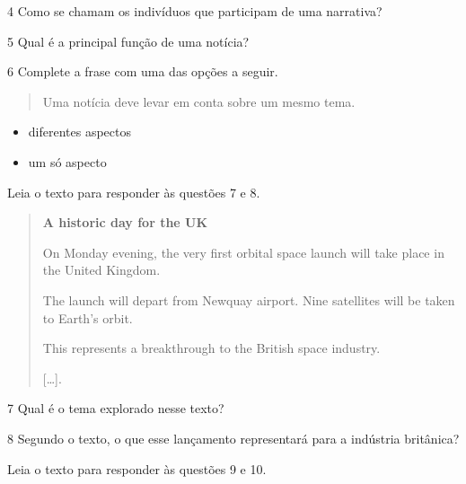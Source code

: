 \num{4} Como se chamam os indivíduos que participam de uma narrativa?



\num{5} Qual é a principal função de uma notícia?



\num{6} Complete a frase com uma das opções a seguir.

\begin{quote}
Uma notícia deve levar em conta  sobre um mesmo tema.
\end{quote}

\begin{itemize}
	\item diferentes aspectos
	\item um só aspecto
\end{itemize}

Leia o texto para responder às questões 7 e 8.

\begin{quote}
\textbf{A historic day for the UK}

On Monday evening, the very first orbital space launch will take place in the United Kingdom.

The launch will depart from Newquay airport. Nine satellites will be taken to Earth’s orbit.

This represents a breakthrough to the British space industry.

{[}\ldots{}{]}.

\end{quote}

\num{7} Qual é o tema explorado nesse texto?



\num{8} Segundo o texto, o que esse lançamento representará para a indústria britânica?



Leia o texto para responder às questões 9 e 10.


